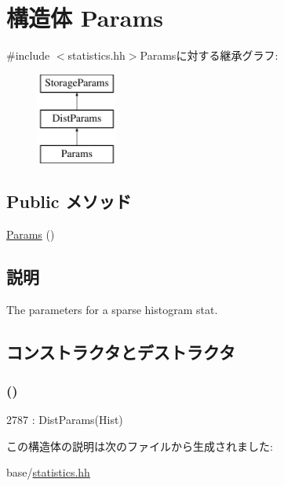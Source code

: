 \hypertarget{structStats_1_1SparseHistStor_1_1Params}{
\section{構造体 Params}
\label{structStats_1_1SparseHistStor_1_1Params}
}


{\ttfamily \#include $<$statistics.hh$>$}Paramsに対する継承グラフ:\begin{figure}[H]
\begin{center}
\leavevmode
\includegraphics[height=3cm]{structStats_1_1SparseHistStor_1_1Params}
\end{center}
\end{figure}
\subsection*{Public メソッド}
\begin{DoxyCompactItemize}
\item 
\hyperlink{structStats_1_1SparseHistStor_1_1Params_a7974597e9d3c848fd265d9445f7cf8cb}{Params} ()
\end{DoxyCompactItemize}


\subsection{説明}
The parameters for a sparse histogram stat. 

\subsection{コンストラクタとデストラクタ}
\hypertarget{structStats_1_1SparseHistStor_1_1Params_a7974597e9d3c848fd265d9445f7cf8cb}{
\subsubsection[{Params}]{ ()}}
\label{structStats_1_1SparseHistStor_1_1Params_a7974597e9d3c848fd265d9445f7cf8cb}



\begin{DoxyCode}
2787 : DistParams(Hist) {}
\end{DoxyCode}


この構造体の説明は次のファイルから生成されました:\begin{DoxyCompactItemize}
\item 
base/\hyperlink{statistics_8hh}{statistics.hh}\end{DoxyCompactItemize}

